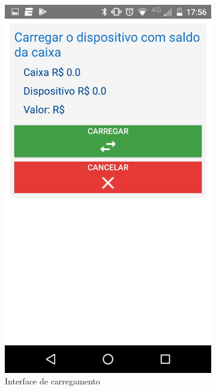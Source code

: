 \documentclass[hidelinks,12pt]{article}
\begin{document}
\begin{figure}[H]
	\begin{subfigure}{0.5\textwidth}
		\includegraphics[scale=0.3]{charge_on} 
		\caption{Interface de carregamento}
		\label{charge}
	\end{subfigure}
	\begin{subfigure}{0.5\textwidth}

\end{subfigure}
\end{figure}
\end{document}
